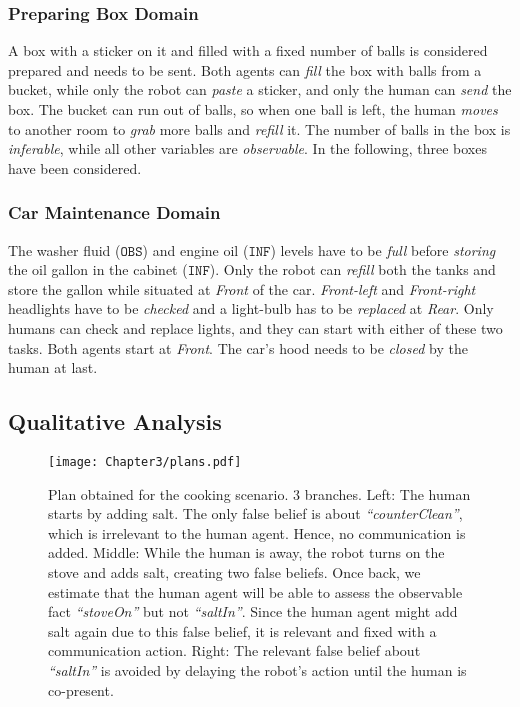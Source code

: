 \subsubsection{Preparing Box Domain}
A box with a sticker on it and filled with a fixed number of balls is considered prepared and needs to be sent. Both agents can \textit{fill} the box with balls from a bucket, while only the robot can \textit{paste} a sticker, and only the human can \textit{send} the box. The bucket can run out of balls, so when one ball is left, the human \textit{moves} to another room to \textit{grab} more balls and \textit{refill} it. 
The number of balls in the box is \textit{inferable}, while all other variables are {\em observable}. 
In the following, three boxes have been considered.

\subsubsection{Car Maintenance Domain}
The washer fluid ($\texttt{OBS}$) and engine oil ($\texttt{INF}$) levels have to be \textit{full} before \textit{storing} the oil gallon in the cabinet ($\texttt{INF}$). 
Only the robot can \textit{refill} both the tanks and store the gallon while situated at \textit{Front} of the car. 
\textit{Front-left} and \textit{Front-right} headlights have to be \textit{checked} and a light-bulb has to be \textit{replaced} at \textit{Rear}. 
Only humans can check and replace lights, and they can start with either of these two tasks.
Both agents start at \textit{Front}.
The car's hood needs to be \textit{closed} by the human at last.

\subsection{Qualitative Analysis}

\begin{figure}[t!]
    \centering
    \texttt{[image: Chapter3/plans.pdf]}
    \caption{
    Plan obtained for the cooking scenario. 3 branches. Left: The human starts by adding salt. The only false belief is about \textit{``counterClean''}, which is irrelevant to the human agent. Hence, no communication is added. Middle: While the human is away, the robot turns on the stove and adds salt, creating two false beliefs. 
    Once back, we estimate that the human agent
    will be able to assess the observable fact \textit{``stoveOn''} but not \textit{``saltIn''}. Since the human agent might add salt again due to this false belief, it is relevant and fixed with a communication action. Right: The relevant false belief about \textit{``saltIn''} is avoided by delaying the robot's action until the human is co-present.
    }
    \label{fig:cooking_plan}
\end{figure}

